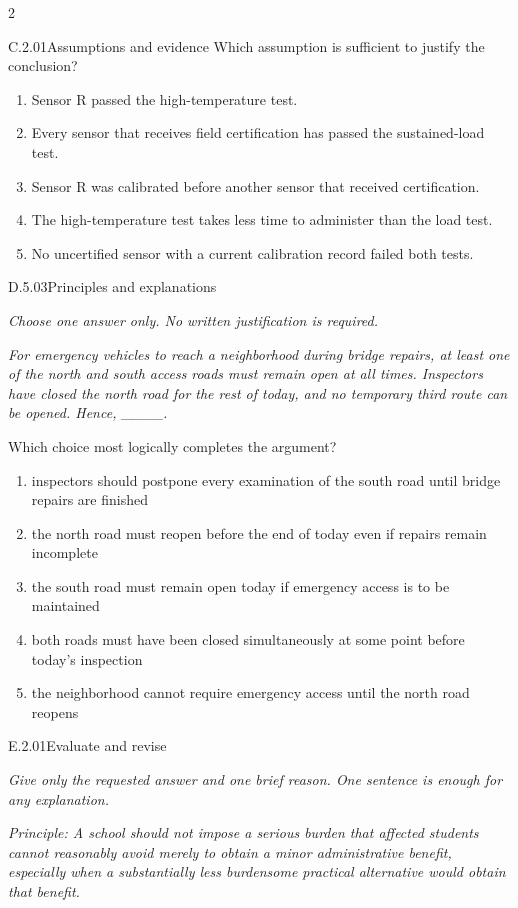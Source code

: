 \documentclass[9pt]{extarticle}
\newcommand{\choice}[1]{\item #1}
\begin{document}
\begin{multicols}{2}
\begin{DenseCoreProblem}{C.2.01}{Assumptions and evidence}
Which assumption is sufficient to justify the conclusion?
\begin{enumerate}[label=(\alph*)]
  \choice{Sensor R passed the high-temperature test.}
  \choice{Every sensor that receives field certification has passed the sustained-load test.}
  \choice{Sensor R was calibrated before another sensor that received certification.}
  \choice{The high-temperature test takes less time to administer than the load test.}
  \choice{No uncertified sensor with a current calibration record failed both tests.}
\end{enumerate}
\end{DenseCoreProblem}
\begin{DenseCoreProblem}{D.5.03}{Principles and explanations}
{\scriptsize\textit{Choose one answer only. No written justification is required.}\par}
\emph{For emergency vehicles to reach a neighborhood during bridge repairs, at least one of the north and south access roads must remain open at all times. Inspectors have closed the north road for the rest of today, and no temporary third route can be opened. Hence, \_\_\_\_.}

Which choice most logically completes the argument?
\begin{enumerate}[label=(\alph*)]
  \choice{inspectors should postpone every examination of the south road until bridge repairs are finished}
  \choice{the north road must reopen before the end of today even if repairs remain incomplete}
  \choice{the south road must remain open today if emergency access is to be maintained}
  \choice{both roads must have been closed simultaneously at some point before today's inspection}
  \choice{the neighborhood cannot require emergency access until the north road reopens}
\end{enumerate}
\end{DenseCoreProblem}
\begin{DenseCoreProblem}{E.2.01}{Evaluate and revise}
{\scriptsize\textit{Give only the requested answer and one brief reason. One sentence is enough for any explanation.}\par}
\emph{Principle: A school should not impose a serious burden that affected students cannot reasonably avoid merely to obtain a minor administrative benefit, especially when a substantially less burdensome practical alternative would obtain that benefit.}


\end{DenseCoreProblem}
\end{multicols}
\end{document}
